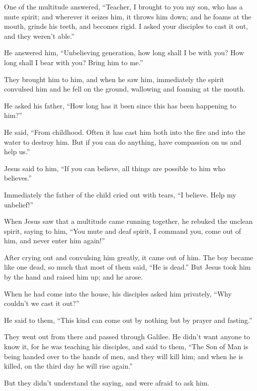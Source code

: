  One of the multitude answered, ``Teacher, I brought to you
my son, who has a mute spirit;  and wherever it seizes him,
it throws him down; and he foams at the mouth, grinds his teeth, and
becomes rigid. I asked your disciples to cast it out, and they weren't
able.''

 He answered him, ``Unbelieving generation, how long shall
I be with you? How long shall I bear with you? Bring him to me.''

 They brought him to him, and when he saw him, immediately
the spirit convulsed him and he fell on the ground, wallowing and
foaming at the mouth.

 He asked his father, ``How long has it been since this has
been happening to him?''

He said, ``From childhood.  Often it has cast him both into
the fire and into the water to destroy him. But if you can do anything,
have compassion on us and help us.''

 Jesus said to him, ``If you can believe, all things are
possible to him who believes.''

 Immediately the father of the child cried out with tears,
``I believe. Help my unbelief!''

 When Jesus saw that a multitude came running together, he
rebuked the unclean spirit, saying to him, ``You mute and deaf spirit, I
command you, come out of him, and never enter him again!''

 After crying out and convulsing him greatly, it came out
of him. The boy became like one dead, so much that most of them said,
``He is dead.''  But Jesus took him by the hand and raised
him up; and he arose.

 When he had come into the house, his disciples asked him
privately, ``Why couldn't we cast it out?''

 He said to them, ``This kind can come out by nothing but
by prayer and fasting.''

 They went out from there and passed through Galilee. He
didn't want anyone to know it,  for he was teaching his
disciples, and said to them, ``The Son of Man is being handed over to
the hands of men, and they will kill him; and when he is killed, on the
third day he will rise again.''

 But they didn't understand the saying, and were afraid to
ask him.


